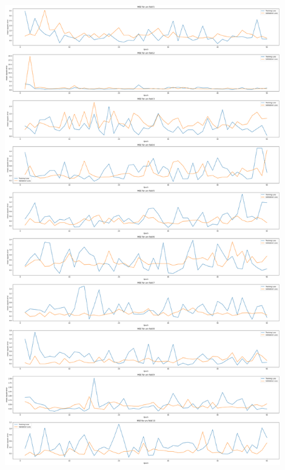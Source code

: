 \documentclass[11pt, a4paper]{article}
\begin{document}
    \begin{center}
        \includegraphics[width=0.9\textwidth]{GINCONV_folds10errors.png}
    \end{center}
\end{document}
